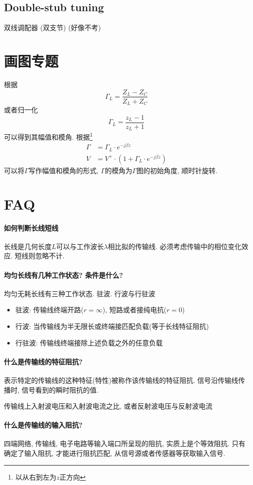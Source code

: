 \documentclass[a4paper]{report}
\begin{document}
\subsection{Double-stub tuning}
双线调配器 (双支节) (好像不考)
\section{画图专题}
根据$$\Gamma_L=\frac{Z_L-Z_C}{Z_L+Z_C}$$
或者归一化$$\Gamma_L=\frac{z_L-1}{z_L+1}$$
可以得到其幅值和模角. 
根据\footnote{以从右到左为$z$正方向}
\begin{align*}
  \Gamma&=\Gamma_L\cdot e^{-j\beta z}
  \\ V&=V^+\cdot(1+\Gamma_L\cdot e^{-j\beta z})
\end{align*}
可以将$\Gamma$写作幅值和模角的形式, $\Gamma$的模角为$\Gamma$图的初始角度, 顺时针旋转. 
\section{FAQ}
\paragraph{如何判断长线短线}
长线是几何长度$L$可以与工作波长$\lambda$相比拟的传输线. 必须考虑传输中的相位变化效应. 短线则忽略不计. 
\paragraph{均匀长线有几种工作状态? 条件是什么? }
均匀无耗长线有三种工作状态. 驻波. 行波与行驻波
\begin{itemize}
  \item 驻波: 传输线终端开路($r=\infty$), 短路或者接纯电抗($r=0$)
  \item 行波: 当传输线为半无限长或终端接匹配负载(等于长线特征阻抗)
  \item 行驻波: 传输线终端接除上述负载之外的任意负载
\end{itemize}
\paragraph{什么是传输线的特征阻抗?}
表示特定的传输线的这种特征(特性)被称作该传输线的特征阻抗. 信号沿传输线传播时, 信号看到的瞬时阻抗的值. 

传输线上入射波电压和入射波电流之比, 或者反射波电压与反射波电流
\paragraph{什么是传输线的输入阻抗?}
四端网络, 传输线, 电子电路等输入端口所呈现的阻抗, 实质上是个等效阻抗. 只有确定了输入阻抗, 才能进行阻抗匹配, 从信号源或者传感器等获取输入信号. 
\end{document}
